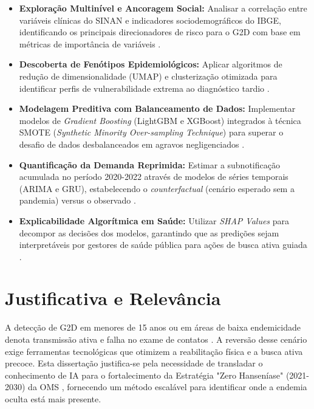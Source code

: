 \begin{itemize}
    \item \textbf{Exploração Multinível e Ancoragem Social:} Analisar a correlação entre variáveis clínicas do SINAN e indicadores sociodemográficos do IBGE, identificando os principais direcionadores de risco para o G2D com base em métricas de importância de variáveis \cite{freitas2025evaluating, clinical_variables_northeast}.
    \item \textbf{Descoberta de Fenótipos Epidemiológicos:} Aplicar algoritmos de redução de dimensionalidade (UMAP) e clusterização otimizada para identificar perfis de vulnerabilidade extrema ao diagnóstico tardio \cite{mcinnes2018umap, becht2018dimensionality}.
    \item \textbf{Modelagem Preditiva com Balanceamento de Dados:} Implementar modelos de \textit{Gradient Boosting} (LightGBM e XGBoost) integrados à técnica SMOTE (\textit{Synthetic Minority Over-sampling Technique}) para superar o desafio de dados desbalanceados em agravos negligenciados \cite{leveraging_xgboost_explainable, seltman2020exploratory}.
    \item \textbf{Quantificação da Demanda Reprimida:} Estimar a subnotificação acumulada no período 2020-2022 através de modelos de séries temporais (ARIMA e GRU), estabelecendo o \textit{counterfactual} (cenário esperado sem a pandemia) versus o observado \cite{shahidi2021forecasting, sousa2024predicting}.
    \item \textbf{Explicabilidade Algorítmica em Saúde:} Utilizar \textit{SHAP Values} para decompor as decisões dos modelos, garantindo que as predições sejam interpretáveis por gestores de saúde pública para ações de busca ativa guiada \cite{leveraging_xgboost_explainable}.
\end{itemize}

\section{Justificativa e Relevância}

A detecção de G2D em menores de 15 anos ou em áreas de baixa endemicidade denota transmissão ativa e falha no exame de contatos \cite{boletim2025hanseniase}. A reversão desse cenário exige ferramentas tecnológicas que otimizem a reabilitação física e a busca ativa precoce. Esta dissertação justifica-se pela necessidade de transladar o conhecimento de IA para o fortalecimento da Estratégia "Zero Hanseníase" (2021-2030) da OMS \cite{who_hans_2021}, fornecendo um método escalável para identificar onde a endemia oculta está mais presente.